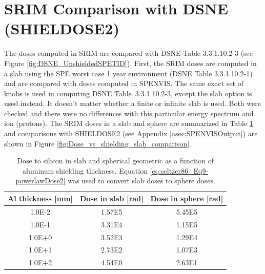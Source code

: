 \documentclass{hitec}
\begin{document}
\section{SRIM Comparison with DSNE (SHIELDOSE2)}

The doses computed in SRIM are compared with DSNE Table 3.3.1.10.2-3 (see Figure \ref{fig:DSNE_UnshieldedSPETID}). First, the SRIM doses are computed in a slab using the SPE worst case 1 year environment (DSNE Table 3.3.1.10.2-1) and are compared with doses computed in SPENVIS. The same exact set of knobs is used in computing DSNE Table~3.3.1.10.2-3, except the \textsf{slab} option is used instead. It doesn't matter whether a finite or infinite slab is used. Both were checked and there were no differences with this particular energy spectrum and ion (protons). The SRIM doses in a slab and sphere are summarized in Table \ref{tab:SRIM_doses} and comparisons with SHIELDOSE2 (see Appendix \ref{asec:SPENVISOutput}) are shown in Figure \ref{fig:Dose_vs_shielding_slab_comparison}.

\begin{table}[h]\centering
	\caption{Dose to silicon in slab and spherical geometric as a function of aluminum shielding thickness. Equation \eqref{eq:seltzer86_Eq9-powerlawDose2} was used to convert slab doses to sphere doses.}\label{tab:SRIM_doses}
	\begin{tabular}{|c | c | c |}\hline
		Al thickness [mm] & Dose in slab [rad] & Dose in sphere [rad]  \\\hline
		1.0E-2 & 1.57E5 & 5.45E5 \\\hline
		1.0E-1 & 3.31E4 & 1.15E5 \\\hline
		1.0E+0 & 3.52E3 & 1.29E4 \\\hline
		1.0E+1 & 2.73E2 & 1.07E3 \\\hline
		1.0E+2 & 4.54E0 & 2.63E1 \\\hline
	\end{tabular}
\end{table}
\end{document}
